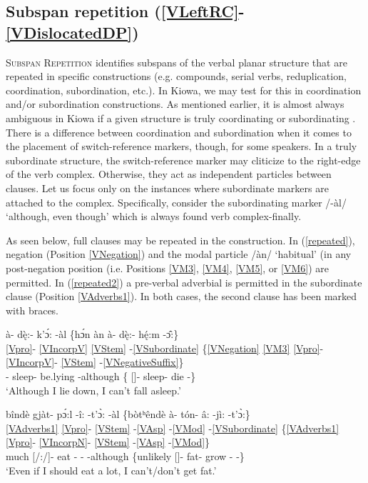 \documentclass[output=paper]{langscibook}
\begin{document}
\subsection{Subspan repetition (\ref{VLeftRC}-\ref{VDislocatedDP})} \label{sec:subspanrep}

{\textsc{Subspan Repetition}} identifies subspans of the verbal planar structure that are repeated in specific constructions (e.g. compounds, serial verbs, reduplication, coordination, subordination, etc.). In Kiowa, we may test for this in coordination and/or subordination constructions. As mentioned earlier, it is almost always ambiguous in Kiowa if a given structure is truly coordinating or subordinating \citep[][]{Watkins:1984}. There is a difference between coordination and subordination when it comes to the placement of switch-reference markers, though, for some speakers. In a truly subordinate structure, the switch-reference marker may cliticize to the right-edge of the verb complex. Otherwise, they act as independent particles between clauses. Let us focus only on the instances where subordinate markers are attached to the complex. Specifically, consider the subordinating marker /-\`al/ `although, even though' which is always found verb complex-finally. 

As seen below, full clauses may be repeated in the construction. In (\ref{repeated}), negation (Position \ref{VNegation}) and the modal particle /\`an/ `habitual' (in any post-negation position (i.e. Positions \ref{VM3}, \ref{VM4}, \ref{VM5}, or \ref{VM6}) are permitted. In (\ref{repeated2}) a pre-verbal adverbial is permitted in the subordinate clause (Position \ref{VAdverbs1}). In both cases, the second clause has been marked with braces.

\ea \label{repeated}
\glll \`a- d\k{è}:- k'\'{ɔ}: -\`al {\{}h\'{ɔ}n \`an \`a- d\k{è}:- h\k{é}:m -\^{ɔ}:{\}}\\
{\ref{Vpro}}- \ref{VIncorpV} \ref{VStem} -\ref{VSubordinate} {\{}\ref{VNegation} \ref{VM3} {\ref{Vpro}}- \ref{VIncorpV}- \ref{VStem} -\ref{VNegativeSuffix}{\}}\\
[\First\Sg]- sleep- be.lying -although {\{}{\Neg} {\Hab} [\First\Sg]- sleep- die -{\Neg}{\}} \\
\trans `Although I lie down, I can't fall asleep.' \citep[][242]{Watkins:1984}%
\z 

\ea \label{repeated2}
\glll bîndè gj\`at- p\'{ɔ}:l -î: -t'\`{ɔ}: -\`al {\{}bòtʰêndè \`a- tón- â: -j\`i: -t'\`{ɔ}:{\}}\\
\ref{VAdverbs1} {\ref{Vpro}}- \ref{VStem} -\ref{VAsp} -\ref{VMod} -\ref{VSubordinate} {\{}\ref{VAdverbs1} {\ref{Vpro}}- \ref{VIncorpN}- \ref{VStem} -\ref{VAsp} -\ref{VMod}{\}}\\
much [\First\Sg/\Aarg:\Pl/\Obj]- eat -{\Ipfv} -{\Fut} -although {\{}unlikely [\First\Sg]- fat- grow -{\Ipfv} -{\Fut}{\}} \\
\trans `Even if I should eat a lot, I can't/don't get fat.' \citep[][242]{Watkins:1984} %
\z 
\end{document}
